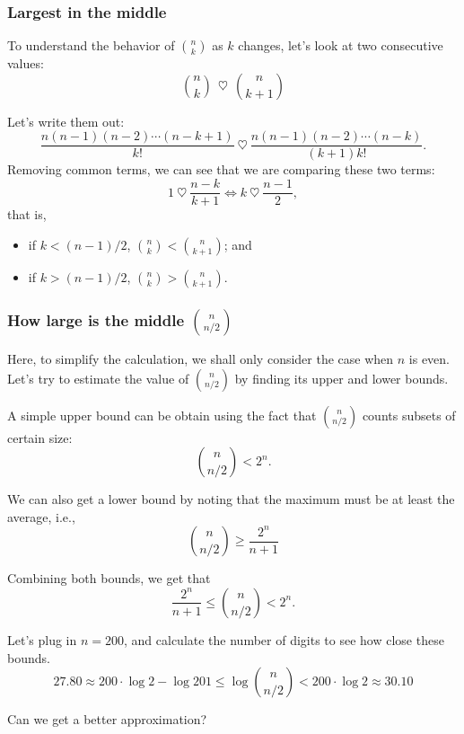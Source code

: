 \begin{frame}\frametitle{Largest in the middle}
  To understand the behavior of $\binom{n}{k}$ as $k$ changes, let's
  look at two consecutive values:
  \[ \binom{n}{k} \ \ \heartsuit \ \ \binom{n}{k+1}\]
  \pause

  Let's write them out:
  \[ \frac{n(n-1)(n-2)\cdots(n-k+1)}{k!} \ \heartsuit \ \frac{n(n-1)(n-2)\cdots(n-k)}{(k+1)k!}.\]
  \pause
  Removing common terms, we can see that we are comparing these two terms:
  \[ 1 \ \heartsuit \ \frac{n-k}{k+1} \Leftrightarrow k \ \heartsuit \ \frac{n-1}{2},\]
  that is, \pause
  \begin{itemize}
  \item if $k<(n-1)/2$, $\binom{n}{k}<\binom{n}{k+1}$; and
  \item if $k>(n-1)/2$, $\binom{n}{k} > \binom{n}{k+1}$.
  \end{itemize}
\end{frame}

\begin{frame}\frametitle{How large is the middle $\binom{n}{n/2}$}
  Here, to simplify the calculation, we shall only consider the case
  when $n$ is even. Let's try to estimate the value of
  $\binom{n}{n/2}$ by finding its upper and lower bounds.
  \pause

  A simple upper bound can be obtain using the fact that
  $\binom{n}{n/2}$ counts subsets of certain size:
  \[\binom{n}{n/2} < 2^n.\]
  \pause

  We can also get a lower bound by noting that the maximum must be at
  least the average, i.e.,
  \[\binom{n}{n/2} \geq \frac{2^n}{n+1}\]
\end{frame}

\begin{frame}
  Combining both bounds, we get that
  \[\frac{2^n}{n+1}\leq \binom{n}{n/2} < 2^n.\]

  \pause Let's plug in $n=200$, and calculate the number of digits to
  see how close these bounds.
  \[27.80 \approx 200\cdot\log 2 - \log 201 \leq \log\binom{n}{n/2} < 200\cdot \log 2\approx 30.10\]
  \pause

  Can we get a better approximation?
\end{frame}
